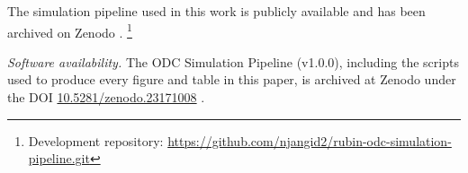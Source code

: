 
The simulation pipeline used in this work is publicly available and has
been archived on Zenodo \citep{jangid2026odcpipeline}.%
\footnote{Development repository: \url{https://github.com/njangid2/rubin-odc-simulation-pipeline.git}}

\textit{Software availability.} The ODC Simulation Pipeline (v1.0.0),
including the scripts used to produce every figure and table in this
paper, is archived at Zenodo under the DOI
\href{https://doi.org/10.5281/zenodo.23171008}{10.5281/zenodo.23171008}
\citep{jangid2026odcpipeline}.


%
